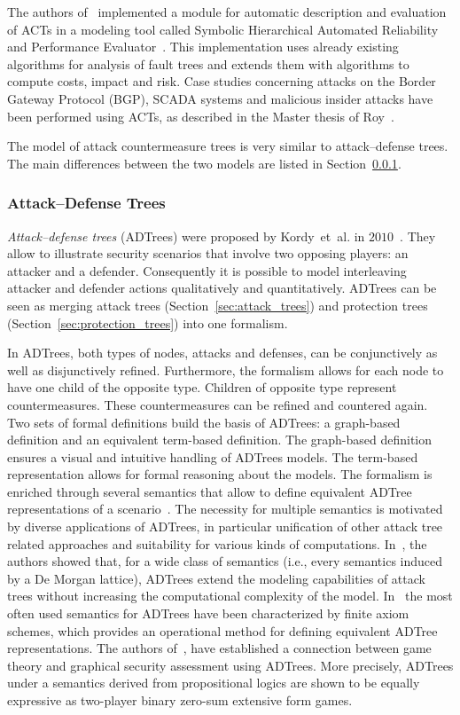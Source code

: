 \documentclass[a4paper]{article}
\begin{document}
The authors of~\cite{RoKiTr2} implemented a module for automatic description and
evaluation of ACTs in a modeling tool called Symbolic Hierarchical Automated
Reliability and Performance Evaluator~\cite{sharpe}. This implementation uses
already existing algorithms for analysis of fault trees and extends them with
algorithms to compute costs, impact and risk. Case studies concerning attacks on
the Border Gateway Protocol (BGP), SCADA systems and malicious insider attacks
have been performed using ACTs, as described in the Master thesis of
Roy~\cite{Roy}.

The model of attack countermeasure trees is very similar to 
attack--defense trees. The main differences between the two models 
are listed in Section~\ref{sec:attack_defense_trees}.

\subsubsection{Attack--Defense Trees} 
\label{sec:attack_defense_trees}

\emph{Attack--defense trees} (ADTrees) were proposed by Kordy~et~al. in
$2010$~\cite{KoMaRaSc}. They allow to illustrate security scenarios that involve
two opposing players: an attacker and a defender. Consequently it is  possible 
to model interleaving attacker and defender actions qualitatively and 
quantitatively. ADTrees can be seen as merging attack trees
(Section~\ref{sec:attack_trees}) and protection trees
(Section~\ref{sec:protection_trees}) into one formalism.

In ADTrees, both types of nodes, attacks and defenses, can be conjunctively as
well as disjunctively refined. Furthermore, the formalism allows for each node
to have one child of the opposite type. Children of opposite type represent
countermeasures. These countermeasures can be refined and countered again.  Two
sets of formal definitions build the basis of ADTrees: a graph-based definition
and an equivalent term-based definition. The graph-based definition ensures a
visual and intuitive handling of ADTrees models. The term-based representation
allows for formal reasoning about the models.  The formalism is enriched through
several semantics that allow to define  equivalent ADTree representations of a
scenario~\cite{KoMaRaSc2}. The necessity for multiple semantics is motivated by
diverse applications of ADTrees, in particular unification of other attack tree
related approaches and suitability for various kinds of computations.
In~\cite{KoPoSc}, the authors showed that, for a wide class of semantics (i.e.,
every semantics induced by a De Morgan lattice), ADTrees extend the modeling
capabilities of attack trees without increasing the computational complexity of
the model.  In~\cite{KoMaRaSc2} the most often used semantics for ADTrees have
been  characterized by finite axiom schemes, which provides an operational
method for  defining equivalent ADTree representations.  The authors
of~\cite{KoMaMeSc}, have established a connection between game theory and
graphical security assessment using ADTrees. More precisely, ADTrees under a
semantics derived from  propositional logics are shown to be  equally expressive
as two-player binary zero-sum extensive form games.
\end{document}
